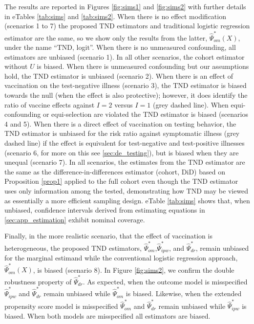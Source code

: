 \documentclass[11pt]{article}
\begin{document}
The results are reported in Figures \ref{fig:sims1} and \ref{fig:sims2} with further details in eTables \ref{tab:sims} and \ref{tab:sims2}. When there is no effect modification (scenarios 1 to 7) the proposed TND estimators and traditional logistic regression estimator are the same, so we show only the results from the latter, $\widehat{\Psi}_{om}^*(X)$, under the name ``TND, logit''. When there is no unmeasured confounding, all estimators are unbiased (scenario 1). In all other scenarios, the cohort estimator without $U$ is biased. When there is unmeasured confounding but our assumptions hold, the TND estimator is unbiased (scenario 2). When there is an effect of vaccination on the test-negative illness (scenario 3), the TND estimator is biased towards the null (when the effect is also protective); however, it does identify the ratio of vaccine effects against $I = 2$ versus $I = 1$ (grey dashed line). When equi-confounding or equi-selection are violated the TND estimator is biased (scenarios 4 and 5).  When there is a direct effect of vaccination on testing behavior, the TND estimator is unbiased for the risk ratio against symptomatic illness (grey dashed line) if the effect is equivalent for test-negative and test-positive illnesses (scenario 6, for more on this see  \ref{sec:de_testing}), but is biased when they are unequal (scenario 7). In all scenarios, the estimates from the TND estimator are the same as the difference-in-differences estimator (cohort, DiD) based on Proposition \ref{prop1} applied to the full cohort even though the TND estimator uses only information among the tested, demonstrating how TND may be viewed as essentially a more efficient sampling design. eTable \ref{tab:sims} shows that, when unbiased, confidence intervals derived from estimating equations in  \ref{sec:app_estimation} exhibit nominal coverage.

Finally, in the more realistic scenario, that the effect of vaccination is heterogeneous, the proposed TND estimators, $\widehat{\Psi}_{om}^*$,$\widehat{\Psi}_{ipw}^*$, and $\widehat{\Psi}_{dr}^*$, remain unbiased for the marginal estimand while the conventional logistic regression approach, $\widehat{\Psi}_{om}^*(X)$, is biased (scenario 8). In Figure \ref{fig:sims2}, we confirm the double robustness property of $\widehat{\Psi}_{dr}^*$. As expected, when the outcome model is misspecified $\widehat{\Psi}_{ipw}^*$ and $\widehat{\Psi}_{dr}^*$ remain unbiased while $\widehat{\Psi}_{om}^*$ is biased. Likewise, when the extended propensity score model is misspecified $\widehat{\Psi}_{om}^*$ and $\widehat{\Psi}_{dr}^*$ remain unbiased while $\widehat{\Psi}_{ipw}^*$ is biased. When both models are misspecified all estimators are biased.
\end{document}
